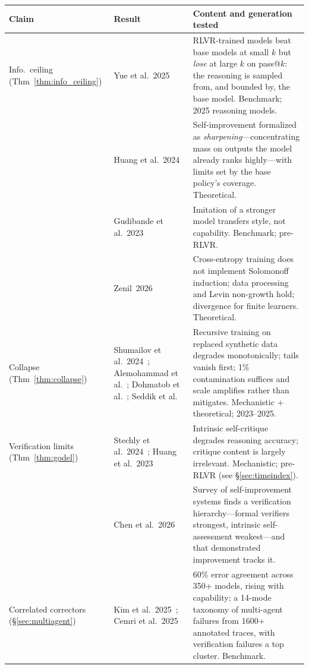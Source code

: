 \documentclass[11pt,a4paper]{article}
\newcommand{\toprule}{\hline}
\newcommand{\midrule}{\hline}
\begin{document}
\begin{table}[h]
\centering
\small
\begin{tabular}{@{}p{2.6cm}p{5.1cm}p{6.4cm}@{}}
\toprule
\textbf{Claim} & \textbf{Result} & \textbf{Content and generation tested} \\
\midrule
Info.\ ceiling (Thm~\ref{thm:info_ceiling}) &
Yue et al.~2025~\cite{yue2025rlvr} &
RLVR-trained models beat base models at small $k$ but \emph{lose} at large $k$ on pass@$k$: the reasoning is sampled from, and bounded by, the base model. Benchmark; 2025 reasoning models. \\[3pt]
& Huang et al.~2024~\cite{huang2024sharpening} &
Self-improvement formalized as \emph{sharpening}---concentrating mass on outputs the model already ranks highly---with limits set by the base policy's coverage. Theoretical. \\[3pt]
& Gudibande et al.~2023~\cite{gudibande2023false} &
Imitation of a stronger model transfers style, not capability. Benchmark; pre-RLVR. \\[3pt]
& Zenil~2026~\cite{limitsself2025} &
Cross-entropy training does not implement Solomonoff induction; data processing and Levin non-growth hold; divergence for finite learners. Theoretical. \\
\midrule
Collapse (Thm~\ref{thm:collapse}) &
Shumailov et al.~2024~\cite{shumailov2024model}; Alemohammad et al.~\cite{alemohammad2023mad}; Dohmatob et al.~\cite{dohmatob2024tails,dohmatob2024strong}; Seddik et al.~\cite{seddik2024synthetic} &
Recursive training on replaced synthetic data degrades monotonically; tails vanish first; 1\% contamination suffices and scale amplifies rather than mitigates. Mechanistic + theoretical; 2023--2025. \\
\midrule
Verification limits (Thm~\ref{thm:godel}) &
Stechly et al.~2024~\cite{stechly2024verification}; Huang et al.~2023~\cite{huang2023selfcorrect} &
Intrinsic self-critique degrades reasoning accuracy; critique content is largely irrelevant. Mechanistic; pre-RLVR (see \S\ref{sec:timeindex}). \\[3pt]
& Chen et al.~2026~\cite{chen2026rsi} &
Survey of self-improvement systems finds a verification hierarchy---formal verifiers strongest, intrinsic self-assessment weakest---and that demonstrated improvement tracks it. \\
\midrule
Correlated correctors (\S\ref{sec:multiagent}) &
Kim et al.~2025~\cite{kim2025correlated}; Cemri et al.~2025~\cite{cemri2025mas} &
60\% error agreement across 350+ models, rising with capability; a 14-mode taxonomy of multi-agent failures from 1600+ annotated traces, with verification failures a top cluster. Benchmark. \\[3pt]

\end{tabular}
\end{table}
\end{document}
